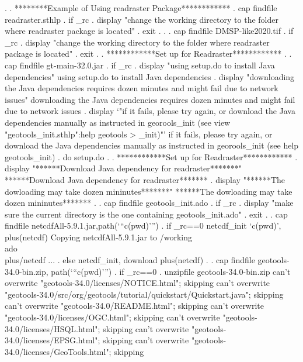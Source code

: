 . 
. ********Example of Using readraster Package************
. cap findfile readraster.sthlp
{\smallskip}
.     if _rc {\lbr}
.     display "change the working directory to the folder where readraster package is located"
.     exit
.     {\rbr}
{\smallskip}
. 
. cap findfile DMSP-like2020.tif
{\smallskip}
. if _rc {\lbr}
.    display "change the working directory to the folder where readraster package is located"
.    exit
. {\rbr}
{\smallskip}
. ************Set up for Readraster************
. 
. cap findfile gt-main-32.0.jar
{\smallskip}
. if _rc {\lbr}
.    display "using setup.do to install Java dependencies"
using setup.do to install Java dependencies
.    display "downloading the Java dependencies requires dozen minutes and might fail due to network issues"
downloading the Java dependencies requires dozen minutes and might fail due to network issues
.    display `"if it fails, please try again, or download the Java dependencies manually as instructed in georools_init (see {\lbr}view "geotools_init.sthlp":help geotools
> _init{\rbr})"'
if it fails, please try again, or download the Java dependencies manually as instructed in georools_init (see help geotools_init)
.    do setup.do
{\smallskip}
. 
. ************Set up for Readraster************
. display "******Download Java dependency for readraster*******"
******Download Java dependency for readraster*******
{\smallskip}
. display "******The dowloading may take dozen mininutes*******"
******The dowloading may take dozen mininutes*******
{\smallskip}
. 
. cap findfile geotools_init.ado
{\smallskip}
. if _rc {\lbr}
.         display "make sure the current directory is the one containing geotools_init.ado"
.         exit
. {\rbr}
{\smallskip}
. cap findfile netcdfAll-5.9.1.jar,path(`"`c(pwd)'"')
{\smallskip}
. if _rc==0 netcdf_init `c(pwd)', plus(netcdf)
Copying netcdfAll-5.9.1.jar to /working\\ado\\plus/netcdf ...
{\smallskip}
. else netcdf_init, download plus(netcdf)
{\smallskip}
. 
. cap findfile geotools-34.0-bin.zip, path(`"`c(pwd)'"')
{\smallskip}
. if _rc==0{\lbr}
.      unzipfile geotools-34.0-bin.zip
    can't overwrite "geotools-34.0/licenses/NOTICE.html"; skipping
    can't overwrite "geotools-34.0/src/org/geotools/tutorial/quickstart/Quickstart.java"; skipping
    can't overwrite "geotools-34.0/README.html"; skipping
    can't overwrite "geotools-34.0/licenses/OGC.html"; skipping
    can't overwrite "geotools-34.0/licenses/HSQL.html"; skipping
    can't overwrite "geotools-34.0/licenses/EPSG.html"; skipping
    can't overwrite "geotools-34.0/licenses/GeoTools.html"; skipping
